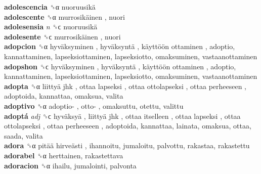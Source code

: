 \textbf{adolescencia} ␝α   nuoruusikä   \\
\textbf{adolescente} ␝α   murrosikäinen , nuori  \\
\textbf{adolesensia} \emph{n}  ␝ϲ   nuoruusikä   \\
\textbf{adolesente} ␝ϲ   murrosikäinen , nuori  \\
\textbf{adopcion} ␝α   hyväksyminen ,  hyväksyntä ,  käyttöön ottaminen , adoptio, kannattaminen, lapseksiottaminen, lapseksiotto, omaksuminen, vastaanottaminen  \\
\textbf{adopshon} ␝ϲ   hyväksyminen ,  hyväksyntä ,  käyttöön ottaminen , adoptio, kannattaminen, lapseksiottaminen, lapseksiotto, omaksuminen, vastaanottaminen  \\
\textbf{adopta} ␝α   liittyä jhk ,  ottaa lapseksi ,  ottaa ottolapseksi ,  ottaa perheeseen , adoptoida, kannattaa, omaksua, valita  \\
\textbf{adoptivo} ␝α   adoptio- ,  otto- , omaksuttu, otettu, valittu  \\
\textbf{adoptá} \emph{adj}  ␝ϲ   hyväksyä ,  liittyä jhk ,  ottaa itselleen ,  ottaa lapseksi ,  ottaa ottolapseksi ,  ottaa perheeseen , adoptoida, kannattaa, lainata, omaksua, ottaa, saada, valita  \\
\textbf{adora} ␝α   pitää hirveästi , ihannoitu, jumaloitu, palvottu, rakastaa, rakastettu  \\
\textbf{adorabel} ␝α  herttainen, rakastettava  \\
\textbf{adoracion} ␝α  ihailu, jumalointi, palvonta  \\
